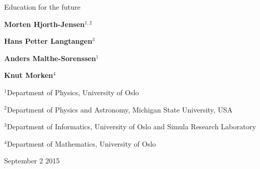 \documentclass[%
oneside,                 %
final,                   %
10pt]{article}
\begin{document}






\thispagestyle{empty}

\begin{center}
{\LARGE\bf
\begin{spacing}{1.25}
Education for the future
\end{spacing}
}
\end{center}


\begin{center}
{\bf Morten Hjorth-Jensen${}^{1, 2}$} \\ [0mm]
\end{center}


\begin{center}
{\bf Hans Petter Langtangen${}^{3}$} \\ [0mm]
\end{center}


\begin{center}
{\bf Anders Malthe-Sorenssen${}^{1}$} \\ [0mm]
\end{center}


\begin{center}
{\bf Knut Morken${}^{4}$} \\ [0mm]
\end{center}

\begin{center}
\centerline{{\small ${}^1$Department of Physics, University of Oslo}}
\centerline{{\small ${}^2$Department of Physics and Astronomy, Michigan State University, USA}}
\centerline{{\small ${}^3$Department of Informatics, University of Oslo and Simula Research Laboratory}}
\centerline{{\small ${}^4$Department of Mathematics, University of Oslo}}
\end{center}
    

\begin{center} %
September 2 2015
\end{center}

\vspace{1cm}


\end{document}
